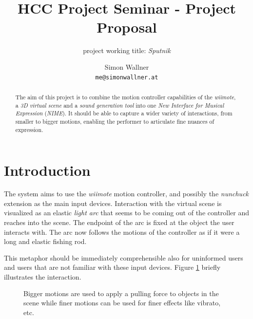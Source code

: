 \documentclass[10pt,a4paper]{scrartcl}
\author{Simon Wallner\\\small{\texttt{me@simonwallner.at}}}
\title{HCC Project Seminar - Project Proposal}
\subtitle{project working title: \emph{Sputnik}}
\begin{document}
\maketitle

\begin{abstract}
The aim of this project is to combine the motion controller capabilities of the \emph{wiimote}, a \emph{3D virtual scene} and a \emph{sound generation tool} into one \emph{New Interface for Musical Expression} (\emph{NIME}). It should be able to capture a wider variety of interactions, from smaller to bigger motions, enabling the performer to articulate fine nuances of expression.
\end{abstract}

\section{Introduction}
The system aims to use the \emph{wiimote} motion controller, and possibly the \emph{nunchuck} extension as the main input devices. Interaction with the virtual scene is visualized as an elastic \emph{light arc} that seems to be coming out of the controller and reaches into the scene. The endpoint of the arc is fixed at the object the user interacts with. The arc now follows the motions of the controller as if it were a long and elastic fishing rod.

This metaphor should be immediately comprehensible also for uninformed users and users that are not familiar with these input devices.  Figure \ref{fig:motion} briefly illustrates the interaction.


\begin{figure}[hbtp]
\centering
{}
\caption{Bigger motions are used to apply a pulling force to objects in the scene while finer motions can be used for finer effects like vibrato, etc.}
\label{fig:motion}
\end{figure}
\end{document}
